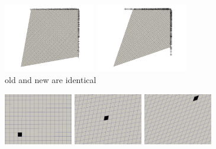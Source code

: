 \begin{center}
\includegraphics[width=4cm]{python_codes/fieldstone_89/results/pureshear/old_dirs0005}
\includegraphics[width=4cm]{python_codes/fieldstone_89/results/pureshear/old_dirs0010}\\
{\captionfont old and new are identical}
\end{center}

\begin{center}
\includegraphics[width=3cm]{python_codes/fieldstone_89/results/pureshear/target0000}
\includegraphics[width=3cm]{python_codes/fieldstone_89/results/pureshear/target0005}
\includegraphics[width=3cm]{python_codes/fieldstone_89/results/pureshear/target0010}
\end{center}


